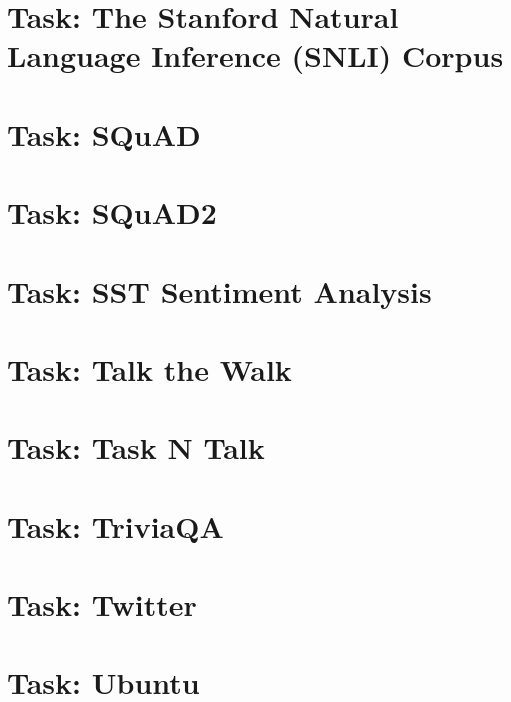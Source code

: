 \documentclass[twoside]{book}
\newcommand{\+}{\discretionary{\mbox{\scriptsize$\hookleftarrow$}}{}{}}
\begin{document}
\chapter{Task\+: The Stanford Natural Language Inference (S\+N\+LI) Corpus}
\label{md_parlai_tasks_snli_README}

\chapter{Task\+: S\+Qu\+AD}
\label{md_parlai_tasks_squad_README}

\chapter{Task\+: S\+Qu\+A\+D2}
\label{md_parlai_tasks_squad2_README}

\chapter{Task\+: S\+ST Sentiment Analysis}
\label{md_parlai_tasks_sst_README}

\chapter{Task\+: Talk the Walk}
\label{md_parlai_tasks_talkthewalk_README}

\chapter{Task\+: Task N\textquotesingle{} Talk}
\label{md_parlai_tasks_taskntalk_README}

\chapter{Task\+: Trivia\+QA}
\label{md_parlai_tasks_triviaqa_README}

\chapter{Task\+: Twitter}
\label{md_parlai_tasks_twitter_README}

\chapter{Task\+: Ubuntu}
\label{md_parlai_tasks_ubuntu_README}

\end{document}
